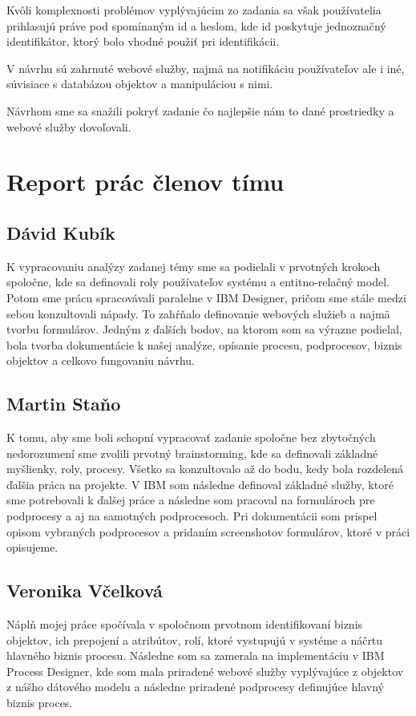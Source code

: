 \documentclass[10pt,oneside,slovak,a4paper]{article}
\begin{document}
Kvôli komplexnosti problémov vyplývajúcim zo zadania sa však používatelia prihlasujú práve pod spomínaným id a heslom, kde id poskytuje jednoznačný identifikátor, ktorý bolo vhodné použiť pri identifikácii.

V návrhu sú zahrnuté webové služby, najmä na notifikáciu používateľov ale i iné, súvisiace s databázou objektov a manipuláciou s nimi.

Návrhom sme sa snažili pokryť zadanie čo najlepšie nám to dané prostriedky a webové služby dovoľovali.

\section{Report prác členov tímu}
\subsection{Dávid Kubík}
K vypracovaniu analýzy zadanej témy sme sa podielali v prvotných krokoch spoločne, kde sa definovali roly používateľov systému a entitno-relačný model. Potom sme prácu spracovávali paralelne v IBM Designer, pričom sme stále medzi sebou konzultovali nápady. To zahŕňalo definovanie webových služieb a najmä tvorbu formulárov. Jedným z ďalších bodov, na ktorom som sa výrazne podielal, bola tvorba dokumentácie k našej analýze, opísanie procesu, podprocesov, biznis objektov a celkovo fungovaniu návrhu.
\subsection{Martin Staňo}
K tomu, aby sme boli schopní vypracovať zadanie spoločne bez zbytočných nedorozumení sme zvolili prvotný brainstorming, kde sa definovali základné myšlienky, roly, procesy. Všetko sa konzultovalo až do bodu, kedy bola rozdelená ďalšia práca na projekte. V IBM som následne definoval základné služby, ktoré sme potrebovali k ďalšej práce a následne som pracoval na formulároch pre podprocesy a aj na samotných podprocesoch. Pri dokumentácii som prispel opisom vybraných podprocesov a pridaním screenshotov formulárov, ktoré v práci opisujeme.
\subsection{Veronika Včelková}
Náplň mojej práce spočívala v spoločnom prvotnom identifikovaní biznis objektov, ich prepojení a atribútov, rolí, ktoré vystupujú v systéme a náčrtu hlavného biznis procesu. Následne som sa zamerala na implementáciu v IBM Process Designer, kde som mala priradené webové služby vyplývajúce z objektov z nášho dátového modelu a následne priradené podprocesy definujúce hlavný biznis proces.
\end{document}
